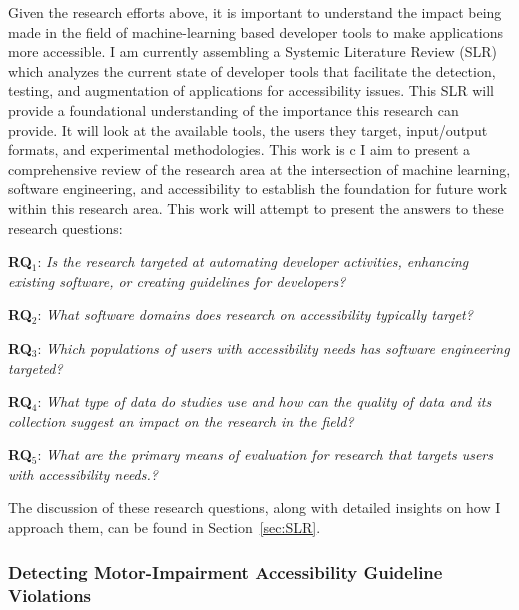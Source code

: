 Given the research efforts above, it is important to understand the impact being made in the field of machine-learning based developer tools to make applications more accessible. I am currently assembling a Systemic Literature Review (SLR) which analyzes the current state of developer tools that facilitate the detection, testing, and augmentation of applications for accessibility issues. This SLR will provide a foundational understanding of the importance this research can provide. It will look at the available tools, the users they target, input/output formats, and experimental methodologies. 
This work is c
I aim to present a comprehensive review of the research area at the intersection of machine learning, software engineering, and accessibility to establish the foundation for future work within this research area. This work will attempt to present the answers to these research questions: 

\begin{description}
  
    \item \textbf{RQ$_1$}: \textit{Is the research targeted at automating developer activities, enhancing existing software, or creating guidelines for developers?}
    \item \textbf{RQ$_2$}: \textit{What software domains does research on accessibility typically target?}
    \item \textbf{RQ$_3$}: \textit{Which populations of users with accessibility needs has software engineering targeted?}
    \item \textbf{RQ$_4$}: \textit{What type of data do studies use and how can the quality of data and its collection suggest an impact on the research in the field?}
    \item \textbf{RQ$_5$}: \textit{What are the primary means of evaluation for research that targets users with accessibility needs.?}

 \end{description}
The discussion of these research questions, along with detailed insights on how I approach them, can be found in Section~\ref{sec:SLR}.




\subsubsection{Detecting Motor-Impairment Accessibility Guideline Violations}

